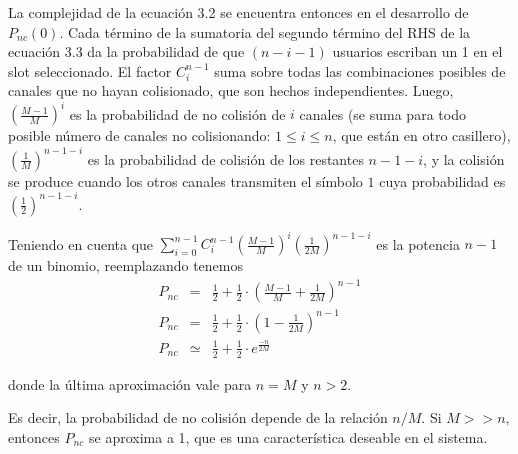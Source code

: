 La complejidad de la ecuación 3.2 se encuentra entonces en el desarrollo de $P_{nc}(0)$. Cada término de la sumatoria del segundo término del RHS de la ecuación 3.3 da la probabilidad de que $(n-i-1)$ usuarios escriban un 1 en el slot seleccionado.
El factor $C^{n-1}_{i}$ suma sobre todas las combinaciones posibles de canales que no hayan colisionado, que son hechos independientes.
\noindent Luego, $\left(\frac{M-1}{M}\right)^i$ es la probabilidad de no colisión de $i$ canales (se suma para todo posible número de canales no
colisionando: $1\leq i\leq n$, que están en otro casillero), $
\left(\frac{1}{M}\right)^{n-1-i}$ es la probabilidad de colisión de los restantes
$n-1-i$, y la colisión se produce cuando los otros canales
transmiten el símbolo $1$ cuya probabilidad es $\left(\frac{1}{2}\right)^{n-1-i}$.



\noindent Teniendo en cuenta que $ \sum_{i=0}^{n-1}
C^{n-1}_{i} \left(\frac{M-1}{M}\right)^i  \left(\frac{1}{2M}\right)^{n-1-i}$ es la potencia $n-1$ de un binomio, reemplazando tenemos
\begin{eqnarray}
P_{nc} & = & \frac{1}{2} +  \frac{1}{2} \cdot \left(\frac{M-1}{M} + \frac{1}{2M} \right)^{n-1} \\
P_{nc} & = & \frac{1}{2} +  \frac{1}{2} \cdot \left(1- \frac{1}{2M} \right)^{n-1} \\
P_{nc} & \simeq & \frac{1}{2} +  \frac{1}{2} \cdot e^{\frac{-n}{2M}}
\end{eqnarray}

\noindent donde la última aproximación vale para $n=M$ y $n > 2$.


Es decir, la probabilidad de no colisión depende de la relación $n/M$. Si $M>>n$, entonces $P_{nc}$ se aproxima a 1, que es una característica deseable en el sistema.
\iffalse

\vspace{5mm}

